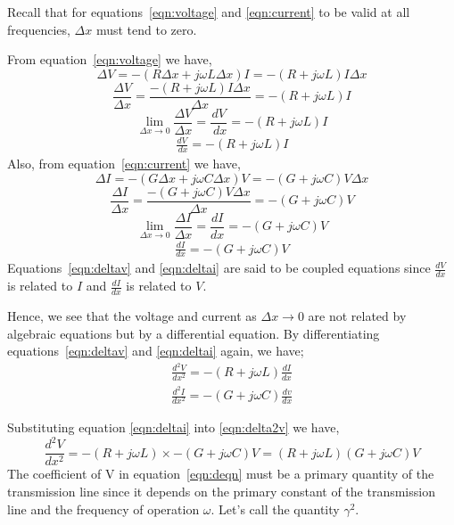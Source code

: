 Recall that for equations~\eqref{eqn:voltage} and \eqref{eqn:current} to be valid at all frequencies, $\Delta x$ must tend to zero.

From equation~\eqref{eqn:voltage} we have,
\begin{dmath*}
\Delta V = - (R \Delta x + j\omega L\Delta x)I = - (R + j\omega L)I\Delta x
\end{dmath*}
\begin{dmath*}
\frac{\Delta V }{\Delta x} = \frac{ - (R  + j\omega L)I\Delta x}{\Delta x} =  -(R  + j\omega L) I
\end{dmath*}
\[ \lim_{ \Delta x\to 0} \frac{\Delta V}{ \Delta x} = \frac{ dV}{ \ dx} = - (R + j \omega L)I \]
\begin{align}
\frac{ dV}{ \ dx} = - (R + j \omega L)I 
\label{eqn:deltav}
\end{align} 
Also, from equation~\eqref{eqn:current} we have,
\begin{dmath*}
\Delta I = - (G \Delta x + j\omega C\Delta x)V = - (G + j\omega C)V\Delta x
\end{dmath*}
\begin{dmath*}
\frac{	\Delta I }{\Delta x} = \frac{ - (G + j\omega C)V\Delta x}{\Delta x} =  - (G + j\omega C) V
\end{dmath*}
\[ \lim_{ \Delta x\to 0}	\frac{ \Delta I}{ \Delta x} = \frac{dI}{dx} = - (G + j\omega C)V \]
\begin{align}
\frac{dI}{dx} = - (G + j\omega C)V 
\label{eqn:deltai}
\end{align}
Equations~\eqref{eqn:deltav} and \eqref{eqn:deltai} are said to be coupled equations since $ \frac{dV}{dx} $ is related to $I$ and $ \frac{dI}{dx} $  is related to $V$.

Hence, we see that the voltage and current as $\Delta x \rightarrow 0$ are not related by algebraic equations but by a differential equation. By differentiating equations~\eqref{eqn:deltav} and \eqref{eqn:deltai} again, we have; 
\begin{align}
\frac{d^{2}V}{dx^{2}} = - (R + j\omega L)\frac{dI}{dx} 
\label{eqn:delta2v}
\end{align}
\begin{align}
\frac{d^{2}I}{dx^{2}} = - (G + j\omega C)\frac{dv}{dx}
\label{eqn:delta2i}
\end{align}

Substituting equation \eqref{eqn:deltai} into \eqref{eqn:delta2v} we have,
\begin{dmath}
\frac{d^{2}V}{dx^{2}} = - (R + j\omega L)\times -(G + j\omega C)V = (R + j\omega L)(G + j\omega C)V 
\label{eqn:deqn}
\end{dmath}   
The coefficient of V in equation~\ref{eqn:deqn} must be a primary quantity of the transmission line since it depends on the primary constant of the transmission line and the frequency of operation $ \omega$. Let's call the quantity $ \gamma^{2}. $ 

